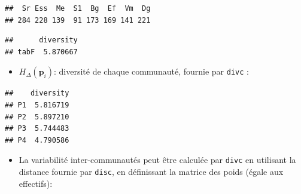 \documentclass[
  11pt,
  french,
  a4paper,
  extrafontsizes,onecolumn,openright
  ]{memoir}
\newenvironment{Shaded}{\begin{snugshade}}{\end{snugshade}}
\newcommand{\FunctionTok}[1]{\textcolor[rgb]{0.13,0.29,0.53}{\textbf{#1}}}
\newcommand{\NormalTok}[1]{#1}
\newcommand{\SpecialCharTok}[1]{\textcolor[rgb]{0.81,0.36,0.00}{\textbf{#1}}}
\providecommand{\tightlist}{%
  \setlength{\itemsep}{0pt}\setlength{\parskip}{0pt}}
\begin{document}
\begin{verbatim}
##  Sr Ess  Me  S1  Bg  Ef  Vm  Dg 
## 284 228 139  91 173 169 141 221
\end{verbatim}

\begin{Shaded}
\end{Shaded}

\begin{verbatim}
##      diversity
## tabF  5.870667
\end{verbatim}

\normalsize

\begin{itemize}
\tightlist
\item
  \(H_{\Delta}\left({\mathbf{p}}_i\right)\): diversité de chaque communauté, fournie par \texttt{divc} :
\end{itemize}

\scriptsize

\begin{Shaded}
\end{Shaded}

\begin{verbatim}
##    diversity
## P1  5.816719
## P2  5.897210
## P3  5.744483
## P4  4.790586
\end{verbatim}

\normalsize

\begin{itemize}
\tightlist
\item
  La variabilité inter-communautés peut être calculée par \texttt{divc} en utilisant la distance fournie par \texttt{disc}, en définissant la matrice des poids (égale aux effectifs):
\end{itemize}

\scriptsize

\begin{Shaded}
\end{Shaded}
\end{document}
